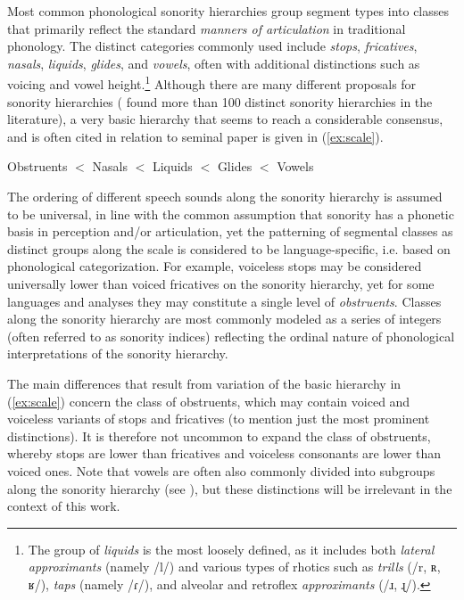 Most common phonological sonority hierarchies group segment types into classes that primarily reflect the standard \emph{manners of articulation} in traditional phonology. The distinct categories commonly used include \emph{stops}, \emph{fricatives}, \emph{nasals}, \emph{liquids}, \emph{glides}, and \emph{vowels}, often with additional distinctions such as voicing and vowel height.\footnote{The group of \emph{liquids} is the most loosely defined, as it includes both \emph{lateral approximants} (namely /l/) and various types of rhotics such as \emph{trills} (/r, ʀ, ʁ/), \emph{taps} (namely /ɾ/), and alveolar and retroflex \emph{approximants} (/ɹ, ɻ/).} Although there are many different proposals for sonority hierarchies (\citealt{parker2002quantifying} found more than 100 distinct sonority hierarchies in the literature), a very basic hierarchy that seems to reach a considerable consensus, and is often cited in relation to 
seminal paper is given in (\ref{ex:scale}).

\begin{exe} 
\ex Obstruents $<$ Nasals $<$ Liquids $<$ Glides $<$ Vowels  \label{ex:scale} 
\end{exe}

The ordering of different speech sounds along the sonority hierarchy is assumed to be universal,
in line with the common assumption that sonority has a phonetic basis in perception and/or articulation, yet the patterning of segmental classes as distinct groups along the scale is considered to be language-specific, i.e. based on phonological categorization.
For example, voiceless stops may be considered universally lower than voiced fricatives on the sonority hierarchy, yet for some languages and analyses they may constitute a single level of \emph{obstruents}. Classes along the sonority hierarchy are most commonly modeled as a series of integers (often referred to as sonority indices) reflecting the ordinal nature of phonological interpretations of the sonority hierarchy.

The main differences that result from variation of the basic hierarchy in (\ref{ex:scale}) concern the class of obstruents, which may contain voiced and voiceless variants of stops and fricatives (to mention just the most prominent distinctions).
It is therefore not uncommon to expand the class of obstruents, whereby stops are lower than fricatives and voiceless consonants are lower than voiced ones.
Note that vowels are often also commonly divided into subgroups along the sonority hierarchy (see \citealt{gordon2012sonority}), but these distinctions will be irrelevant in the context of this work.

